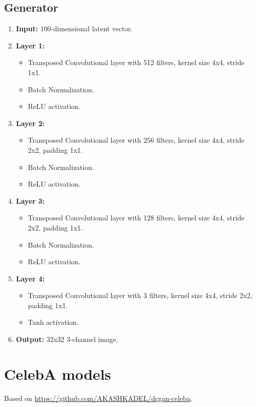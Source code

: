 \subsection*{Generator}
\begin{enumerate}
    \item \textbf{Input:} 100-dimensional latent vector.
    \item \textbf{Layer 1:} 
    \begin{itemize}
        \item Transposed Convolutional layer with 512 filters, kernel size 4x4, stride 1x1.
        \item Batch Normalization.
        \item ReLU activation.
    \end{itemize}
    \item \textbf{Layer 2:} 
    \begin{itemize}
        \item Transposed Convolutional layer with 256 filters, kernel size 4x4, stride 2x2, padding 1x1.
        \item Batch Normalization.
        \item ReLU activation.
    \end{itemize}
    \item \textbf{Layer 3:} 
    \begin{itemize}
        \item Transposed Convolutional layer with 128 filters, kernel size 4x4, stride 2x2, padding 1x1.
        \item Batch Normalization.
        \item ReLU activation.
    \end{itemize}
    \item \textbf{Layer 4:} 
    \begin{itemize}
        \item Transposed Convolutional layer with 3 filters, kernel size 4x4, stride 2x2, padding 1x1.
        \item Tanh activation.
    \end{itemize}
    \item \textbf{Output:} 32x32 3-channel image.
\end{enumerate}

\section{CelebA models}
Based on \url{https://github.com/AKASHKADEL/dcgan-celeba}.
